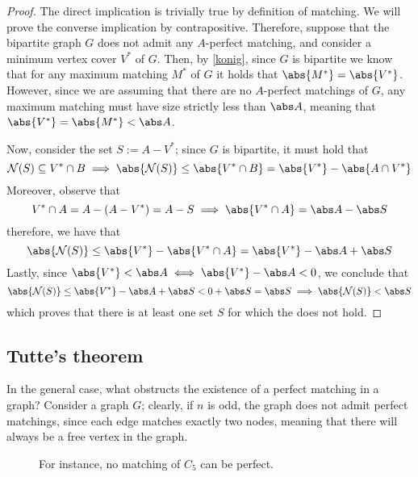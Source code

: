 \documentclass[a4paper, 12pt]{report}
\begin{document}
    \begin{proof}
        The direct implication is trivially true by definition of matching. We will prove the converse implication by contrapositive. Therefore, suppose that the bipartite graph $G$ does not admit any $A$-perfect matching, and consider a minimum vertex cover $V^*$ of $G$. Then, by \cref{konig}, since $G$ is bipartite we know that for any maximum matching $M^*$ of $G$ it holds that $\abs{M^*} = \abs{V^*}$. However, since we are assuming that there are no $A$-perfect matchings of $G$, any maximum matching must have size strictly less than $\abs A$, meaning that $\abs{V^*} = \abs{M^*} < \abs A$.

        Now, consider the set $S := A - V^*$; since $G$ is bipartite, it must hold that $$\mathcal N(S) \subseteq V^* \cap B \implies \abs{\mathcal N(S)} \le \abs{V^* \cap B} = \abs {V^*} - \abs{A \cap V^*}$$ Moreover, observe that $$V^* \cap A = A - (A - V^*) = A - S \implies \abs{V^* \cap A}  = \abs A - \abs S$$ therefore, we have that $$\abs{\mathcal N(S)} \le \abs{V^*} - \abs{V^* \cap A} = \abs{V^*} - \abs A + \abs S$$ Lastly, since $\abs {V^*} < \abs A \iff \abs{V^*} - \abs A < 0$, we conclude that $$\abs{\mathcal N (S)} \le \abs{V^*} - \abs A + \abs S < 0 + \abs S = \abs S \implies \abs{\mathcal N(S)} < \abs S$$ which proves that there is at least one set $S$ for which the  does not hold.
    \end{proof}

    \subsection{Tutte's theorem}

    In the general case, what obstructs the existence of a perfect matching in a graph? Consider a graph $G$; clearly, if $n$ is odd, the graph does not admit perfect matchings, since each edge matches exactly two nodes, meaning that there will always be a free vertex in the graph.

    \begin{figure}[H]
        \centering
        \caption{For instance, no matching of $C_5$ can be perfect.}
    \end{figure}
\end{document}
